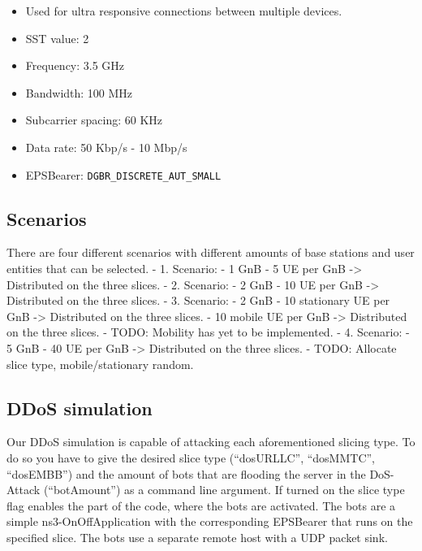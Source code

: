 \begin{itemize}
        \begin{itemize}
            \item Used for ultra responsive connections between multiple devices.
            \item SST value: 2
            \item Frequency: 3.5 GHz
            \item Bandwidth: 100 MHz
            \item Subcarrier spacing: 60 KHz
            \item Data rate: 50 Kbp/s - 10 Mbp/s
            \item EPSBearer: \verb!DGBR_DISCRETE_AUT_SMALL!
        \end{itemize}
    \end{itemize}
    
    \subsection{Scenarios}
    There are four different scenarios with different amounts of base stations and user entities that can be selected.
    - 1. Scenario:
	    - 1 GnB
	    - 5 UE per GnB -> Distributed on the three slices.
    - 2. Scenario:
	    - 2 GnB
	    - 10 UE per GnB -> Distributed on the three slices.
    - 3. Scenario:
	    - 2 GnB
	    - 10 stationary UE per GnB ->  Distributed on the three slices.
	    - 10 mobile UE per GnB -> Distributed on the three slices.
        - TODO: Mobility has yet to be implemented.
    - 4. Scenario:
	    - 5 GnB
	    - 40 UE per GnB -> Distributed on the three slices.
        - TODO: Allocate slice type, mobile/stationary random.
    
    \subsection{DDoS simulation}
    Our DDoS simulation is capable of attacking each aforementioned slicing type. To do so you have to give the desired slice type (``dosURLLC'', ``dosMMTC'', ``dosEMBB'') and the amount of bots that are flooding the server in the DoS-Attack (``botAmount'') as a command line argument. If turned on the slice type flag enables the part of the code, where the bots are activated. 
    The bots are a simple ns3-OnOffApplication with the corresponding EPSBearer that runs on the specified slice.
    The bots use a separate remote host with a UDP packet sink.    